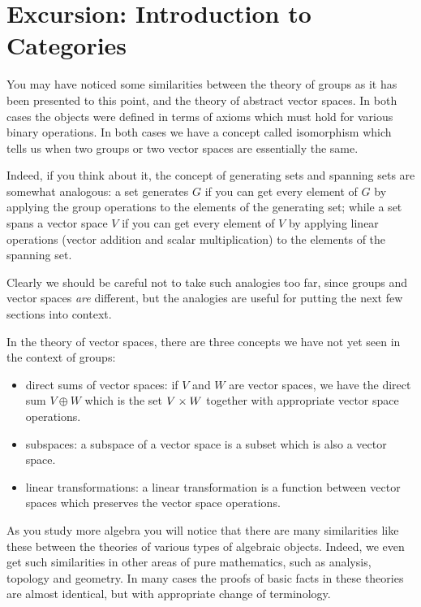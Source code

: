 \section{Excursion: Introduction to Categories}

You may have noticed some similarities between the theory of groups as it has
been presented to this point, and the theory of abstract vector spaces.  In
both cases the objects were defined in terms of axioms which must hold for
various binary operations.  In both cases we have a concept called isomorphism
which tells us when two groups or two vector spaces are essentially the same.

Indeed, if you think about it, the concept of generating sets and
spanning sets are somewhat analogous: a set generates $G$ if you can get every
element of $G$ by applying the group operations to the elements of the generating
set; while a set spans a vector space $V$ if you can get every element of $V$
by applying linear operations (vector addition and scalar multiplication) to
the elements of the spanning set.

Clearly we should be careful not to take such analogies too far, since groups
and vector spaces \emph{are} different, but the analogies are useful for putting
the next few sections into context.

In the theory of vector spaces, there are three concepts we have not yet seen
in the context of groups:
\begin{itemize}
  \item direct sums of vector spaces: if $V$ and $W$ are vector spaces, we
    have the direct sum $V \oplus W$ which is the set $V \times W$ together
    with appropriate vector space operations.
  
  \item subspaces: a subspace of a vector space is a subset which is also a
    vector space.
  
  \item linear transformations: a linear transformation is a function between
    vector spaces which preserves the vector space operations.
\end{itemize}

As you study more algebra you will notice that there are many similarities
like these between the theories of various types of algebraic objects.  Indeed,
we even get such similarities in other areas of pure mathematics, such as
analysis, topology and geometry.  In many cases the proofs of basic facts
in these theories are almost identical, but with appropriate change of
terminology.

